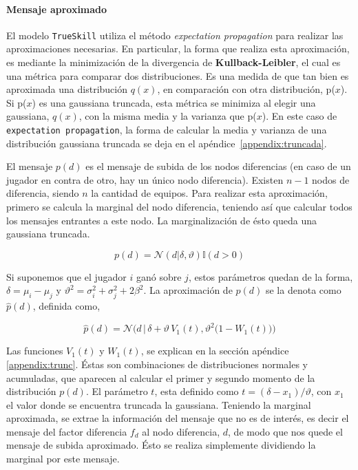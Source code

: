 \documentclass[11pt,twoside,spanish]{report} %
\begin{document}
\paragraph{Mensaje aproximado}

El modelo \texttt{TrueSkill} utiliza el m\'etodo \textit{expectation propagation} para realizar las aproximaciones necesarias.
En particular, la forma que realiza esta aproximaci\'on, es mediante la minimizaci\'on de la divergencia de \textbf{Kullback-Leibler}, el cual es una m\'etrica para comparar dos distribuciones.
Es una medida de que tan bien es aproximada una distribuci\'on $q(x)$, en comparaci\'on con otra distribuci\'on, p($x$).
Si p($x$) es una gaussiana truncada, esta m\'etrica se minimiza al elegir una gaussiana,  $q(x)$, con la misma media y la varianza que p($x$).
En este caso de \texttt{expectation propagation}, la forma de calcular la media y varianza de una distribuci\'on gaussiana truncada se deja en el ap\'endice~\ref{appendix:truncada}.


El mensaje $p(d)$ es el mensaje de subida de los nodos diferencias (en caso de un jugador en contra de otro,  hay un \'unico nodo diferencia).
Existen $n-1$ nodos de diferencia, siendo $n$ la cantidad de equipos.
Para realizar esta aproximaci\'on, primero se calcula la marginal del nodo diferencia, teniendo as\'i que calcular todos los mensajes entrantes a este nodo.
La marginalizaci\'on de \'esto queda una gaussiana truncada.

\begin{equation}
	p(d) = \mathcal{N}(d|\delta,\vartheta) \mathbb{I}(d > 0)
\end{equation}

Si suponemos que el jugador $i$ gan\'o sobre $j$, estos par\'ametros quedan de la forma, $\delta = \mu_{i}-\mu_{j}$ y
$\vartheta^2 = \sigma_i^2 + \sigma_j^2+2\beta^2$.
La aproximaci\'on  de $p(d)$ se la denota como $\widehat{p}(d)$, definida como,

\begin{equation}\label{eq:aprox}
\widehat{p}(d) = \mathcal{N}\Bigg(d \,  \bigg| \,  \delta + \vartheta \, V_1(t) ,  \vartheta^2 \big( 1 - W_1(t) \big)  \Bigg)
\end{equation}



Las funciones $V_1(t)$ y $W_1(t)$, se explican en la secci\'on ap\'endice \ref{appendix:trunc}.
\'Estas son combinaciones de distribuciones normales y acumuladas, que aparecen al calcular el primer y segundo momento de la distribuci\'on $p(d)$.
El par\'ametro $t$, esta definido como $t = (\delta-x_1)/\vartheta$, con $x_1$ el valor donde se encuentra truncada la gaussiana.
Teniendo la marginal aproximada, se extrae la informaci\'on del mensaje que no es de inter\'es, es decir el mensaje del factor diferencia $f_d$ al nodo diferencia, $d$, de modo que nos quede el mensaje de subida aproximado.
\'Esto se realiza simplemente dividiendo la marginal por este mensaje.
\end{document}
